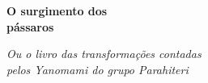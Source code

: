 

\begingroup\thispagestyle{empty}\vspace*{.05\textheight} 

              \formular
              \huge
              \noindent
              \textbf{O surgimento dos\\pássaros}
              
              \vspace{0.3em}

              \noindent\normalsize\textit{Ou o livro das transformações contadas\\ pelos Yanomami do grupo Parahiteri}
                    
\endgroup
\vfill
\pagebreak